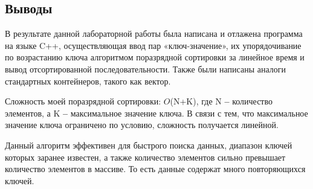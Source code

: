 \documentclass[12pt]{article}
\begin{document}
\begin{figure}[htbp]
    \centering
    \label{fig:graph}
\end{figure}

\newpage
\subsection*{Выводы}


В результате данной лабораторной работы была написана и отлажена программа на языке C++, осуществляющая ввод пар «ключ-значение», их упорядочивание по возрастанию ключа алгоритмом поразрядной сортировки за линейное время и вывод отсортированной последовательности. Также были написаны аналоги стандартных контейнеров, такого как вектор.

Сложность моей поразрядной сортировки: ${O}$(N+K), где N \textbf{--} количество элементов, а K \textbf{--} максимальное значение ключа. В связи с тем, что максимальное значение ключа ограничено по условию, сложность получается линейной.

Данный алгоритм эффективен для быстрого поиска данных, диапазон ключей которых заранее известен, а также количество элементов сильно превышает количество элементов в массиве. То есть данные содержат много повторяющихся ключей.  
\end{document}
